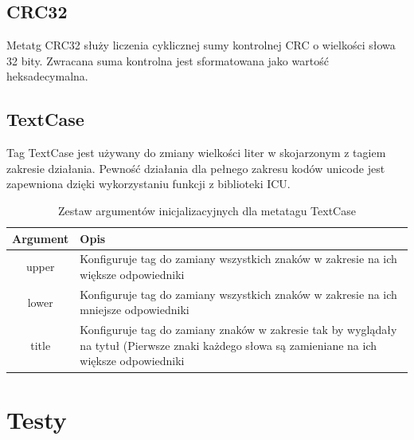 \subsection{CRC32}
Metatg CRC32 służy liczenia cyklicznej sumy kontrolnej CRC o wielkości słowa 32 bity.
Zwracana suma kontrolna jest sformatowana jako wartość heksadecymalna.

\subsection{TextCase}
Tag TextCase jest używany do zmiany wielkości liter w skojarzonym z tagiem zakresie działania. Pewność działania dla pełnego zakresu kodów unicode jest zapewniona dzięki wykorzystaniu funkcji z biblioteki ICU.

\begin{table}[h]
\begin{center}
\begin{tabular}{| c | p{13cm} |}
\hline
\textbf{Argument} & \textbf{Opis} \\
\hline
upper & Konfiguruje tag do zamiany wszystkich znaków w zakresie na ich większe odpowiedniki \\
lower & Konfiguruje tag do zamiany wszystkich znaków w zakresie na ich mniejsze odpowiedniki \\
title & Konfiguruje tag do zamiany znaków w zakresie tak by wyglądały na tytuł (Pierwsze znaki każdego słowa są zamieniane na ich większe odpowiedniki \\
\hline
\end{tabular} \end{center}
\caption{Zestaw argumentów inicjalizacyjnych dla metatagu TextCase}
\end{table}

\section{Testy}
